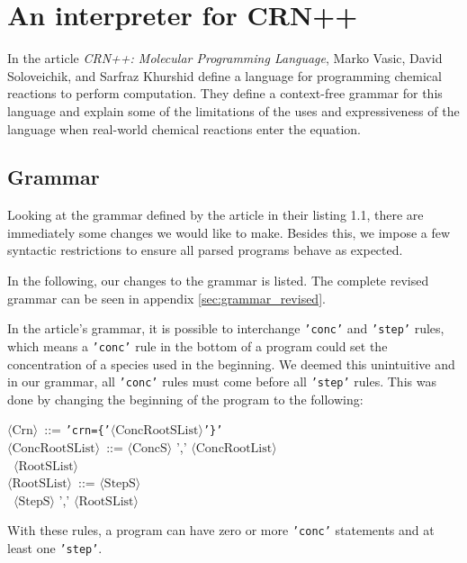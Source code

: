 \section{An interpreter for CRN++}

In the article \textit{CRN++: Molecular Programming Language}, Marko Vasic, David Soloveichik, and Sarfraz Khurshid define a language for programming chemical reactions to perform computation. They define a context-free grammar for this language and explain some of the limitations of the uses and expressiveness of the language when real-world chemical reactions enter the equation. 


\subsection{Grammar}

Looking at the grammar defined by the article in their listing 1.1, there are immediately some changes we would like to make. Besides this, we impose a few syntactic restrictions to ensure all parsed programs behave as expected. 

In the following, our changes to the grammar is listed. The complete revised grammar can be seen in appendix \ref{sec:grammar_revised}. 

In the article's grammar, it is possible to interchange \texttt{'conc'} and \texttt{'step'} rules, which means a \texttt{'conc'} rule in the bottom of a program could set the concentration of a species used in the beginning. We deemed this unintuitive and in our grammar, all \texttt{'conc'} rules must come before all \texttt{'step'} rules. This was done by changing the beginning of the program to the following:
\begin{tabbing}
    $\langle \text{Crn} \rangle$ \,::=\; \= \texttt{'crn=\{'$\langle \text{ConcRootSList} \rangle$'\}'} \\
    
    $\langle \text{ConcRootSList} \rangle$ \,::=\;  $\langle \text{ConcS} \rangle$ ',' $\langle \text{ConcRootList} \rangle$ \\
    \>\textbar \, $\langle \text{RootSList} \rangle$ \\

    $\langle \text{RootSList} \rangle$ \,::=\;  $\langle \text{StepS} \rangle$ \\
    \>\textbar \, $\langle \text{StepS} \rangle$ ',' $\langle \text{RootSList} \rangle$
\end{tabbing}
With these rules, a program can have zero or more \texttt{'conc'} statements and at least one \texttt{'step'}. 

